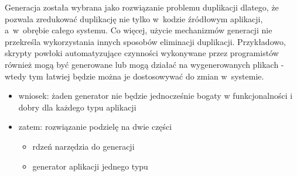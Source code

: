 Generacja została wybrana jako rozwiązanie problemu duplikacji dlatego, że pozwala zredukować duplikację nie tylko w~kodzie źródłowym aplikacji, a~w~obrębie całego systemu.
Co więcej, użycie mechanizmów generacji nie przekreśla wykorzystania innych sposobów eliminacji duplikacji.
Przykładowo, skrypty powłoki automatyzujące czynności wykonywane przez programistów również mogą być generowane lub mogą działać na wygenerowanych plikach - wtedy tym łatwiej będzie można je dostosowywać do zmian w~systemie.

\begin{itemize}
\item wniosek: żaden generator nie będzie jednocześnie bogaty w funkcjonalności i dobry dla każdego typu aplikacji
 \item zatem: rozwiązanie podzielę na dwie części
  \begin{itemize}
   \item rdzeń narzędzia do generacji
   \item generator aplikacji jednego typu
  \end{itemize}
\end{itemize}
